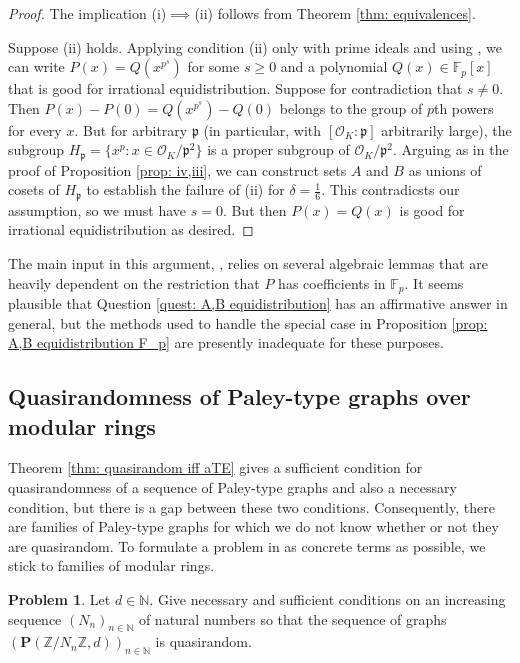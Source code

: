 \documentclass{amsart}
\theoremstyle{definition}
\newtheorem{problem}[theorem]{Problem}
\numberwithin{equation}{section}
\newcommand{\N}{\mathbb{N}}
\newcommand{\Z}{\mathbb{Z}}
\newcommand{\F}{\mathbb{F}}
\newcommand{\p}{\mathfrak{p}}
\newcommand{\bfP}{\mathbf{P}}
\newcommand{\mO}{\mathcal{O}}
\begin{document}
\begin{proof}
    The implication (i)$\implies$(ii) follows from Theorem \ref{thm: equivalences}.

    Suppose (ii) holds.
    Applying condition (ii) only with prime ideals and using \cite[Theorem 1.17]{ab_Sarkozy}, we can write $P(x) = Q(x^{p^s})$ for some $s \ge 0$ and a polynomial $Q(x) \in \F_p[x]$ that is good for irrational equidistribution.
    Suppose for contradiction that $s \ne 0$.
    Then $P(x) - P(0) = Q(x^{p^s}) - Q(0)$ belongs to the group of $p$th powers for every $x$.
    But for arbitrary $\p$ (in particular, with $[\mO_K : \p]$ arbitrarily large), the subgroup $H_{\p} = \{x^p : x \in \mO_K/\p^2\}$ is a proper subgroup of $\mO_K/\p^2$.
    Arguing as in the proof of Proposition \ref{prop: iv,iii}, we can construct sets $A$ and $B$ as unions of cosets of $H_{\p}$ to establish the failure of (ii) for $\delta = \frac{1}{6}$.
    This contradicsts our assumption, so we must have $s = 0$.
    But then $P(x) = Q(x)$ is good for irrational equidistribution as desired.
\end{proof}

The main input in this argument, \cite[Theorem 1.17]{ab_Sarkozy}, relies on several algebraic lemmas that are heavily dependent on the restriction that $P$ has coefficients in $\F_p$.
It seems plausible that Question \ref{quest: A,B equidistribution} has an affirmative answer in general, but the methods used to handle the special case in Proposition \ref{prop: A,B equidistribution F_p} are presently inadequate for these purposes.


\subsection{Quasirandomness of Paley-type graphs over modular rings}

Theorem \ref{thm: quasirandom iff aTE} gives a sufficient condition for quasirandomness of a sequence of Paley-type graphs and also a necessary condition, but there is a gap between these two conditions.
Consequently, there are families of Paley-type graphs for which we do not know whether or not they are quasirandom.
To formulate a problem in as concrete terms as possible, we stick to families of modular rings.

\begin{problem}
    Let $d \in \N$.
    Give necessary and sufficient conditions on an increasing sequence $(N_n)_{n \in \N}$ of natural numbers so that the sequence of graphs $(\bfP(\Z/N_n\Z,d))_{n \in \N}$ is quasirandom.
\end{problem}
\end{document}
